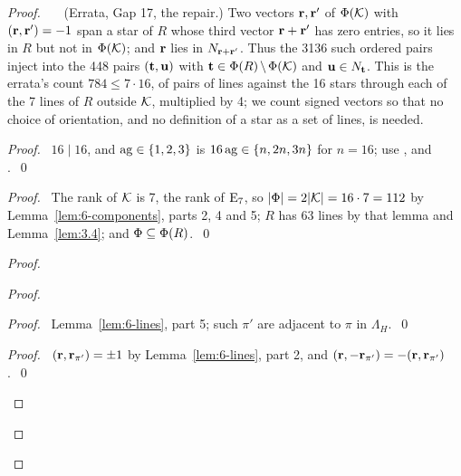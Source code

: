 \begin{proof}
 \pfsketch\ \new\ \repair\ (Errata, Gap 17, the repair.) Two vectors ${\mathbf r},{\mathbf r}'$ of
 $\Phi({\mathcal K})$ with $({\mathbf r},{\mathbf r}')=-1$ span a star of $R$ whose third vector ${\mathbf r}+{\mathbf r}'$ has zero
 entries, so it lies in $R$ but not in $\Phi({\mathcal K})$; and ${\mathbf r}$ lies in
 $N_{{\mathbf r}+{\mathbf r}'}$. Thus the 3136 such ordered pairs inject into the 448 pairs $({\mathbf t},{\mathbf u})$ with
 ${\mathbf t}\in\Phi(R)\mathbin{\mkern-1.5mu\setminus\mkern-1.5mu}\Phi({\mathcal K})$ and ${\mathbf u}\in N_{\mathbf t}$. This is the errata's count $784\leq7\cdot16$,
 of pairs of lines against the 16 stars through each of the 7 lines of $R$ outside ${\mathcal K}$,
 multiplied by 4; we count signed vectors so that no choice of orientation, and no definition of
 a star as a set of lines, is needed.
 \begin{proof}\pf\ $16\mid16$, and $\mathop{\mathrm{ag}}\nolimits\in\{1,2,3\}$ is $16\mathop{\mathrm{ag}}\nolimits\in\{n,2n,3n\}$ for $n=16$;
  use ,  and .~\qed\end{proof}
 \begin{proof}\pf\ The rank of ${\mathcal K}$ is 7, the rank of $\mathrm{E}_7$, so $|\Phi|=2|{\mathcal K}|=16\cdot7=112$
  by Lemma~\ref{lem:6-components}, parts 2, 4 and 5; $R$ has 63 lines by that lemma and
  Lemma~\ref{lem:3.4}; and $\Phi\subseteq\Phi(R)$.~\qed\end{proof}
 \begin{proof}
  \begin{proof}
   \begin{proof}\pf\ Lemma~\ref{lem:6-lines}, part 5; such $\pi'$ are adjacent to $\pi$ in
    $\Lambda_H$.~\qed\end{proof}
   \begin{proof}\pf\ $({\mathbf r},{\mathbf r}_{\pi'})=\pm1$ by Lemma~\ref{lem:6-lines}, part 2, and
    $({\mathbf r},-{\mathbf r}_{\pi'})=-({\mathbf r},{\mathbf r}_{\pi'})$.~\qed\end{proof}

\end{proof}
\end{proof}
\end{proof}
